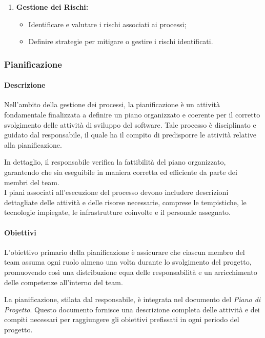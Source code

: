 \begin{enumerate}
    \item \textbf{Gestione dei Rischi:}
      \begin{itemize}
        \item Identificare e valutare i rischi associati ai processi;
        \item Definire strategie per mitigare o gestire i rischi identificati.
      \end{itemize}
  \end{enumerate}
  
\subsubsection{Pianificazione}

\paragraph{Descrizione} 
Nell'ambito della gestione dei processi, la pianificazione è un attività fondamentale finalizzata a definire un piano organizzato e coerente per il corretto svolgimento delle attività di sviluppo del software. Tale processo è disciplinato e guidato dal responsabile, il quale ha il compito di predisporre le attività relative alla pianificazione.

In dettaglio, il responsabile verifica la fattibilità del piano organizzato, garantendo che sia eseguibile in maniera corretta ed efficiente da parte dei membri del team. \\
I piani associati all'esecuzione del processo devono includere descrizioni dettagliate delle attività e delle risorse necessarie, comprese le tempistiche, le tecnologie impiegate, le infrastrutture coinvolte e il personale assegnato.

\paragraph{Obiettivi}

L'obiettivo primario della pianificazione è assicurare che ciascun membro del team assuma ogni ruolo almeno una volta durante lo svolgimento del progetto, promuovendo così una distribuzione equa delle responsabilità e un arricchimento delle competenze all'interno del team.

\vspace{0,1cm}

La pianificazione, stilata dal responsabile, è integrata nel documento del \textit{Piano di Progetto}. Questo documento fornisce una descrizione completa delle attività e dei compiti necessari per raggiungere gli obiettivi prefissati in ogni periodo del progetto.
